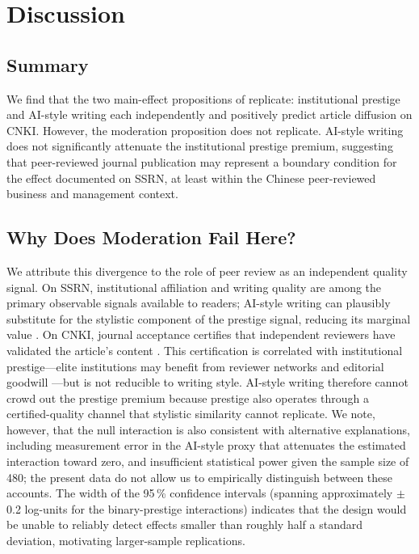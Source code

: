 \documentclass[12pt,a4paper]{article}
\begin{document}
\section{Discussion}
\label{sec:discussion}

\subsection{Summary}

We find that the two main-effect propositions of \citet{JoLi2026}
replicate: institutional prestige and AI-style writing each independently
and positively predict article diffusion on CNKI.
However, the moderation proposition does not replicate.
AI-style writing does not significantly attenuate the institutional
prestige premium, suggesting that peer-reviewed journal publication
may represent a boundary condition for the effect documented on SSRN,
at least within the Chinese peer-reviewed business and management context.

\subsection{Why Does Moderation Fail Here?}

We attribute this divergence to the role of peer review as an
independent quality signal.
On SSRN, institutional affiliation and writing quality are among the
primary observable signals available to readers; AI-style writing can
plausibly substitute for the stylistic component of the prestige signal,
reducing its marginal value \citep{JoLi2026}.
On CNKI, journal acceptance certifies that independent reviewers have
validated the article's content \citep{Bornmann2008}.
This certification is correlated with institutional prestige---elite
institutions may benefit from reviewer networks and editorial goodwill
\citep{Lariviere2010}---but is not reducible to writing style.
AI-style writing therefore cannot crowd out the prestige premium because
prestige also operates through a certified-quality channel that
stylistic similarity cannot replicate.
We note, however, that the null interaction is also consistent with
alternative explanations, including measurement error in the AI-style
proxy that attenuates the estimated interaction toward zero, and
insufficient statistical power given the sample size of 480;
the present data do not allow us to empirically distinguish between
these accounts.
The width of the 95\,\% confidence intervals (spanning approximately
$\pm$0.2 log-units for the binary-prestige interactions) indicates
that the design would be unable to reliably detect effects smaller
than roughly half a standard deviation, motivating larger-sample
replications.
\end{document}
